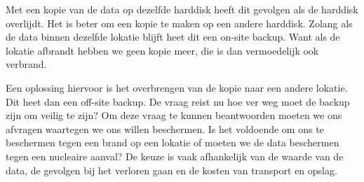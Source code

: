 Met een kopie van de data op dezelfde harddisk heeft dit gevolgen als de harddisk overlijdt. Het is beter om een kopie te maken op een andere harddisk. Zolang als de data binnen dezelfde lokatie blijft heet dit een on-site backup. Want als de lokatie afbrandt hebben we geen kopie meer, die is dan vermoedelijk ook verbrand.

Een oplossing hiervoor is het overbrengen van de kopie naar een andere lokatie. Dit heet dan een off-site backup. De vraag reist nu hoe ver weg moet de backup zijn om veilig te zijn? Om deze vraag te kunnen beantwoorden moeten we ons afvragen waartegen we ons willen beschermen. Is het voldoende om ons te beschermen tegen een brand op een lokatie of moeten we de data beschermen tegen een nucleaire aanval? De keuze is vaak afhankelijk van de waarde van de data, de gevolgen bij het verloren gaan en de kosten van transport en opslag.

